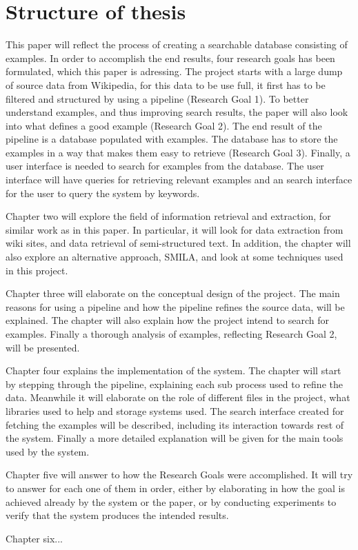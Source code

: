 \section{Structure of thesis}
This paper will reflect the process of creating a searchable database consisting of examples. In order to accomplish the end results, four research goals has been formulated, which this paper is adressing. The project starts with a large dump of source data from Wikipedia, for this data to be use full, it first has to be filtered and structured by using a pipeline (Research Goal 1). To better understand examples, and thus improving search results, the paper will also look into what defines a good example (Research Goal 2). The end result of the pipeline is a database populated with examples. The database has to store the examples in a way that makes them easy to retrieve (Research Goal 3). Finally, a user interface is needed to search for examples from the database. The user interface will have queries for retrieving relevant examples and an search interface for the user to query the system by keywords. 

Chapter two will explore the field of information retrieval and extraction, for similar work as in this paper. In particular, it will look for data extraction from wiki sites, and data retrieval of semi-structured text. In addition, the chapter will also explore an alternative approach, SMILA, and look at some techniques used in this project.

Chapter three will elaborate on the conceptual design of the project. The main reasons for using a pipeline and how the pipeline refines the source data, will be explained. The chapter will also explain how the project intend to search for examples. Finally a thorough analysis of examples, reflecting Research Goal 2, will be presented.

Chapter four explains the implementation of the system. The chapter will start by stepping through the pipeline, explaining each sub process used to refine the data. Meanwhile it will elaborate on the role of different files in the project, what libraries used to help and storage systems used. The search interface created for fetching the examples will be described, including its interaction towards rest of the system. Finally a more detailed explanation will be given for the main tools used by the system.

Chapter five will answer to how the Research Goals were accomplished. It will try to answer for each one of them in order, either by elaborating in how the goal is achieved already by the system or the paper, or by conducting experiments to verify that the system produces the intended results.

Chapter six...


\cleardoublepage